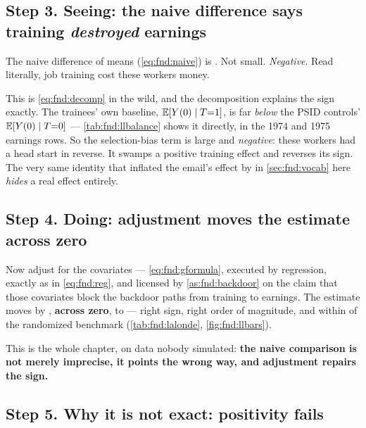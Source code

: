 


\subsection*{Step 3. Seeing: the naive difference says training \emph{destroyed} earnings}

The naive difference of means (\cref{eq:fnd:naive}) is \usd{\nbZeroLlNaive}. Not small.
\emph{Negative}. Read literally, job training cost these workers money.

This is \cref{eq:fnd:decomp} in the wild, and the decomposition explains the sign exactly. The
trainees' own baseline, $\operatorname{\mathbb{E}}[Y(0) \mid T{=}1]$, is far \emph{below} the PSID controls'
$\operatorname{\mathbb{E}}[Y(0) \mid T{=}0]$ --- \cref{tab:fnd:llbalance} shows it directly, in the 1974 and 1975
earnings rows. So the selection-bias term is large and \emph{negative}: these workers had a
head start in reverse. It swamps a positive training effect and reverses its sign. The very
same identity that inflated the email's effect by \eur{\nbZeroSelBias} in \cref{sec:fnd:vocab}
here \emph{hides} a real effect entirely.

\subsection*{Step 4. Doing: adjustment moves the estimate across zero}

Now adjust for the \nbZeroLlNCovs{} covariates --- \cref{eq:fnd:gformula}, executed by
regression, exactly as in \cref{eq:fnd:reg}, and licensed by \cref{as:fnd:backdoor} on the claim
that those covariates block the backdoor paths from training to earnings. The estimate moves by
\usd{\nbZeroLlSwing}, \textbf{across zero}, to \usd{\nbZeroLlAdj} --- right sign, right order of
magnitude, and within \usd{\nbZeroLlShortfall} of the randomized benchmark
(\cref{tab:fnd:lalonde}, \cref{fig:fnd:llbars}).

This is the whole chapter, on data nobody simulated: \textbf{the naive comparison is not merely
imprecise, it points the wrong way, and adjustment repairs the sign.}




\subsection*{Step 5. Why it is not exact: positivity fails}

